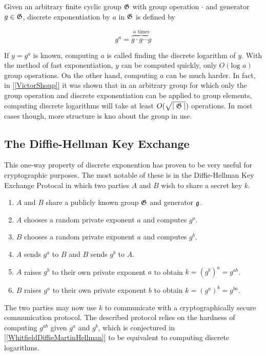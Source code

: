 
Given an arbitrary finite cyclic group $\mathfrak{G}$ with group operation $\cdot$ and generator $g \in \mathfrak{G}$, discrete exponentiation by $a$ in $\mathfrak{G}$ is defined by 

$$
g^a = \overbrace{g \cdot g \cdots g}^{a \text{ times}}
$$

If $y = g^a$ is known, computing $a$ is called finding the discrete logarithm of $y$. With the method of fast exponentiation, $y$ can be computed quickly, only $O(\text{log } a)$ group operations. On the other hand, computing $a$ can be much harder. In fact, in [\ref{VictorShoup}] it was shown that in an arbitrary group for which only the group operation and discrete exponentiation can be applied to group elements, computing discrete logarithms will take at least $O(\sqrt{\mid \mathfrak{G} \mid})$ operations. In most cases though, more structure is kno about the group in use.

\subsection{The Diffie-Hellman Key Exchange}

This one-way property of discrete exponention has proven to be very useful for cryptographic purposes. The most notable of these is in the Diffie-Hellman Key Exchange Protocal in which two parties $A$ and $B$ wish to share a secret key $k$. 

\begin{enumerate}[1.]
	\item $A$ and $B$ share a publicly known group $\mathfrak{G}$ and generator $\mathfrak{g}$. 
	\item $A$ chooses a random private exponent $a$ and computes $g^a$.
	\item $B$ chooses a random private exponent $a$ and computes $g^b$.
	\item $A$ sends $g^a$ to $B$ and $B$ sends $g^b$ to $A$. 
	\item $A$ raises $g^b$ to their own private exponent $a$ to obtain $k = (g^b)^a = g^{ab}$.
	\item $B$ raises $g^a$ to their own private exponent $b$ to obtain $k = (g^a)^b = g^{ba}$.
\end{enumerate}

The two parties may now use $k$ to communicate with a cryptographically secure communication protocol. The described protocol relies on the hardness of computing $g^{ab}$ given $g^a$ and $g^b$, which is conjectured in [\ref{WhitfieldDiffieMartinHellman}] to be equivalent to computing discrete logarithms. \\ 

